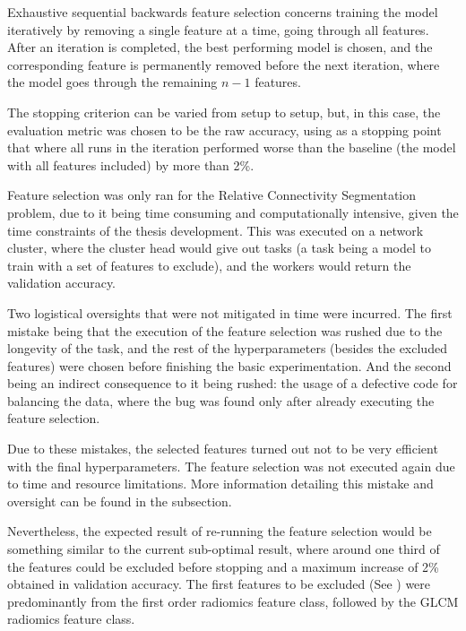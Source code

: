 Exhaustive sequential backwards feature selection concerns training the model iteratively by removing a single feature at a time, going through all features. After an iteration is completed, the best performing model is chosen, and the corresponding feature is permanently removed before the next iteration, where the model goes through the remaining $n-1$ features.\par
The stopping criterion can be varied from setup to setup, but, in this case, the evaluation metric was chosen to be the raw accuracy, using as a stopping point that where all runs in the iteration performed worse than the baseline (the model with all features included) by more than 2\%.\par
Feature selection was only ran for the Relative Connectivity Segmentation problem, due to it being time consuming and computationally intensive, given the time constraints of the thesis development. This was executed on a network cluster, where the cluster head would give out tasks (a task being a model to train with a set of features to exclude), and the workers would return the validation accuracy.\par
Two logistical oversights that were not mitigated in time were incurred. The first mistake being that the execution of the feature selection was rushed due to the longevity of the task, and the rest of the hyperparameters (besides the excluded features) were chosen before finishing the basic experimentation. And the second being an indirect consequence to it being rushed: the usage of a defective code for balancing the data, where the bug was found only after already executing the feature selection.\par
Due to these mistakes, the selected features turned out not to be very efficient with the final hyperparameters. The feature selection was not executed again due to time and resource limitations. More information detailing this mistake and oversight can be found in the  subsection.\par
Nevertheless, the expected result of re-running the feature selection would be something similar to the current sub-optimal result, where around one third of the features could be excluded before stopping and a maximum increase of 2\% obtained in validation accuracy. The first features to be excluded (See ) were predominantly from the first order radiomics feature class, followed by the \ac{GLCM} radiomics feature class.

